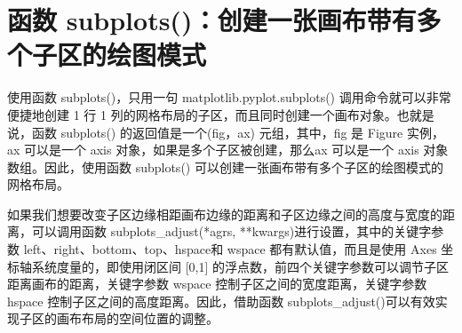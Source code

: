 \section{函数 subplots()：创建一张画布带有多个子区的绘图模式}
使用函数 subplots()，只用一句 matplotlib.pyplot.subplots() 调用命令就可以非常便捷地创建 1 行 1 列的网格布局的子区，而且同时创建一个画布对象。也就是说，函数 subplots() 的返回值是一个(fig，ax) 元组，其中，fig 是 Figure 实例，ax 可以是一个 axis 对象，如果是多个子区被创建，那么ax 可以是一个 axis 对象数组。因此，使用函数 subplots() 可以创建一张画布带有多个子区的绘图模式的网格布局。
\begin{tcolorbox}
    如果我们想要改变子区边缘相距画布边缘的距离和子区边缘之间的高度与宽度的距离，可以调用函数 subplots\_adjust(*agrs, **kwargs)进行设置，其中的关键字参数 left、right、bottom、top、hspace和 wspace 都有默认值，而且是使用 Axes 坐标轴系统度量的，即使用闭区间 [0,1] 的浮点数，前四个关键字参数可以调节子区距离画布的距离，关键字参数 wspace 控制子区之间的宽度距离，关键字参数 hspace 控制子区之间的高度距离。因此，借助函数 subplots\_adjust()可以有效实现子区的画布布局的空间位置的调整。
\end{tcolorbox}